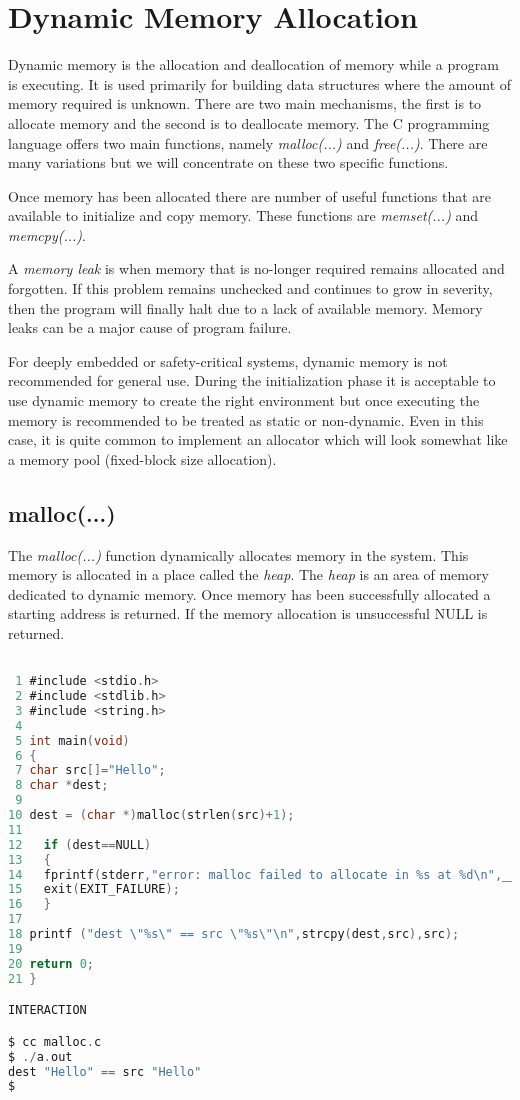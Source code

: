 \section{Dynamic Memory Allocation} \label{DynamicMem}

Dynamic memory is the allocation and deallocation of memory while a program is executing. It is used primarily for building data structures where the amount of memory required is unknown. There are two main mechanisms, the first is to allocate memory and the second is to deallocate memory. The C programming language offers two main functions, namely \textit{malloc(...)} and \textit{free(...)}. There are many variations but we will concentrate on these two specific functions.  

Once memory has been allocated there are number of useful functions that are available to initialize and copy memory. These functions are \textit{memset(...)} and \textit{memcpy(...)}.  

A \textit{memory leak} is when memory that is no-longer required remains allocated and forgotten. If this problem remains unchecked and continues to grow in severity, then the program will finally halt due to a lack of available memory. Memory leaks can be a major cause of program failure.
 
For deeply embedded or safety-critical systems, dynamic memory is not recommended for general use. During the initialization phase it is acceptable to use dynamic memory to create the right environment but once executing the memory is recommended to be treated as static or non-dynamic. Even in this case, it is quite common to implement an allocator which will look somewhat like a memory pool (fixed-block size allocation).

\subsection{malloc(...)}


The \textit{malloc(...)} function dynamically allocates memory in the system. This memory is allocated in a place called the \textit{heap}. The \textit{heap} is an area of memory dedicated to dynamic memory. Once memory has been successfully allocated a starting address is returned. If the memory allocation is unsuccessful NULL is returned.

\begin{lstlisting}[language=C,showstringspaces=false,caption={File: malloc.c},captionpos=b,label=malloc]

 1 #include <stdio.h>
 2 #include <stdlib.h>
 3 #include <string.h>
 4 
 5 int main(void)
 6 {
 7 char src[]="Hello";
 8 char *dest;
 9 
10 dest = (char *)malloc(strlen(src)+1);
11 
12   if (dest==NULL)
13   {
14   fprintf(stderr,"error: malloc failed to allocate in %s at %d\n",__FILE__,__LINE__);
15   exit(EXIT_FAILURE);
16   }
17 
18 printf ("dest \"%s\" == src \"%s\"\n",strcpy(dest,src),src);
19  
20 return 0;
21 } 

INTERACTION

$ cc malloc.c
$ ./a.out
dest "Hello" == src "Hello"
$

\end{lstlisting}


